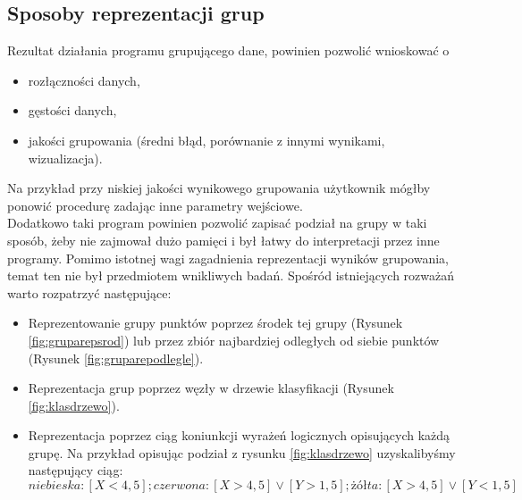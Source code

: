 \documentclass{article}
\begin{document}
\subsection{Sposoby reprezentacji grup}

Rezultat działania programu grupującego dane, powinien pozwolić wnioskować o 
 \begin{itemize}
 	\item rozłączności danych,
 	\item gęstości danych,
 	\item jakości grupowania (średni błąd, porównanie z innymi wynikami, wizualizacja).
 \end{itemize}
 Na przykład przy niskiej jakości wynikowego grupowania użytkownik mógłby ponowić procedurę zadając inne parametry wejściowe. 
 \\
 Dodatkowo taki program powinien pozwolić zapisać podział na grupy w taki sposób, żeby nie zajmował dużo pamięci i był łatwy do interpretacji przez inne programy. Pomimo istotnej wagi zagadnienia reprezentacji wyników grupowania, temat ten nie był  przedmiotem wnikliwych badań. Spośród istniejących rozważań warto rozpatrzyć następujące:

\begin{itemize}
	\item Reprezentowanie grupy punktów poprzez środek tej grupy (Rysunek \ref{fig:gruparepsrod}) lub przez zbiór najbardziej odległych od siebie punktów (Rysunek \ref{fig:gruparepodlegle}).
	\item Reprezentacja grup poprzez węzły w drzewie klasyfikacji (Rysunek \ref{fig:klasdrzewo}).
	\item Reprezentacja poprzez ciąg koniunkcji wyrażeń logicznych opisujących każdą grupę. Na przykład opisując podział z rysunku \ref{fig:klasdrzewo} uzyskalibyśmy następujący ciąg:
	\[ niebieska:[X<4,5]; czerwona:[X>4,5]\vee[Y>1,5]; żółta:[X>4,5]\vee[Y<1,5] \]
\end{itemize}
\end{document}
